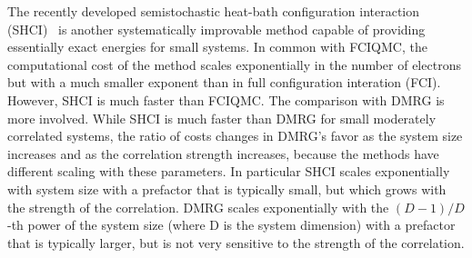 \documentclass[%
reprint,
 superscriptaddress,
 amsmath,amssymb,
 aps,
]{revtex4-1}
\begin{document}
The recently developed semistochastic heat-bath configuration interaction (SHCI)~\cite{HolTubUmr-JCTC-16,ShaHolJeaAlaUmr-JCTC-17,HolUmrSha-JCP-17,SmiMusHolSha-JCTC-17,MusSha-JCTC-17,ChiHolOttUmrShaZim-JPCA-18} is another systematically improvable method capable of providing essentially exact energies for small systems.
In common with FCIQMC, the computational cost of the method scales exponentially in the number of electrons but with a
much smaller exponent than in full configuration interation (FCI).  However, SHCI is much faster than FCIQMC.
The comparison with DMRG is more involved.
{\color{black}
While SHCI is much faster than DMRG for small moderately correlated systems, the ratio of costs changes in
DMRG's favor as the system size increases and as the correlation strength increases, because the methods
have different scaling with these parameters.
In particular SHCI scales exponentially with system size with a prefactor that is typically small, but which grows with
the strength of the correlation.
DMRG scales exponentially with the $(D-1)/D$-th power of the system size (where D is the system dimension) with a prefactor that is typically larger,
but is not very sensitive to the strength of the correlation.
}
\end{document}
